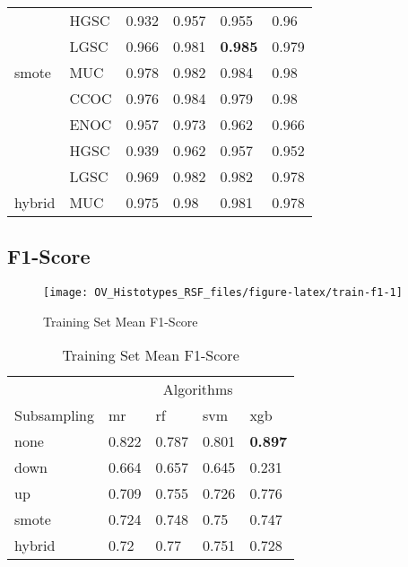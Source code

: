 \documentclass[
]{report}
\begin{document}
\begin{table}
\begin{tabular}[t]{l|l|l|l|l|l}
\cline{2-6}
 & HGSC & 0.932 & 0.957 & 0.955 & 0.96\\
\cline{2-6}
 & LGSC & 0.966 & 0.981 & \textbf{0.985} & 0.979\\
\cline{2-6}
\multirow{-5}{*}{\raggedright\arraybackslash smote} & MUC & 0.978 & 0.982 & 0.984 & 0.98\\
\cline{1-6}
 & CCOC & 0.976 & 0.984 & 0.979 & 0.98\\
\cline{2-6}
 & ENOC & 0.957 & 0.973 & 0.962 & 0.966\\
\cline{2-6}
 & HGSC & 0.939 & 0.962 & 0.957 & 0.952\\
\cline{2-6}
 & LGSC & 0.969 & 0.982 & 0.982 & 0.978\\
\cline{2-6}
\multirow{-5}{*}{\raggedright\arraybackslash hybrid} & MUC & 0.975 & 0.98 & 0.981 & 0.978\\
\hline
\end{tabular}
\end{table}

\hypertarget{f1-score}{%
\subsection{F1-Score}\label{f1-score}}

\begin{figure}[H]

{\centering \texttt{[image: OV\_Histotypes\_RSF\_files/figure-latex/train-f1-1]} 

}

\caption{Training Set Mean F1-Score}\label{fig:train-f1}
\end{figure}

\begin{table}

\caption{\label{tab:train-f1-table}Training Set Mean F1-Score}
\centering
\begin{tabular}[t]{l|l|l|l|l}
\hline
\multicolumn{1}{c|}{ } & \multicolumn{4}{c}{Algorithms} \\
\cline{2-5}
Subsampling & mr & rf & svm & xgb\\
\hline
none & 0.822 & 0.787 & 0.801 & \textbf{0.897}\\
\hline
down & 0.664 & 0.657 & 0.645 & 0.231\\
\hline
up & 0.709 & 0.755 & 0.726 & 0.776\\
\hline
smote & 0.724 & 0.748 & 0.75 & 0.747\\
\hline
hybrid & 0.72 & 0.77 & 0.751 & 0.728\\
\hline
\end{tabular}
\end{table}
\end{document}
